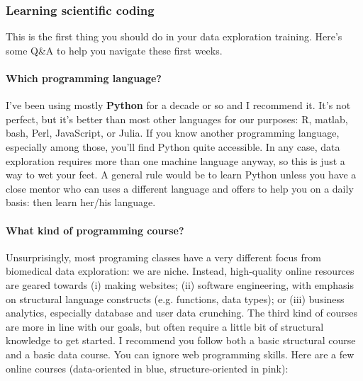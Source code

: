 \documentclass[12pt,a4paper,notitlepage,onecolumn]{article}
\begin{document}
\subsubsection{Learning scientific coding}
This is the first thing you should do in your data exploration training. Here's some Q\&A to help you navigate these first weeks.

\paragraph{Which programming language?} I've been using mostly \textbf{Python} for a decade or so and I recommend it. It's not perfect, but it's better than most other languages for our purposes: R, matlab, bash, Perl, JavaScript, or Julia. If you know another programming language, especially among those, you'll find Python quite accessible. In any case, data exploration requires more than one machine language anyway, so this is just a way to wet your feet. A general rule would be to learn Python unless you have a close mentor who can uses a different language and offers to help you on a daily basis: then learn her/his language.
\paragraph{What kind of programming course?} Unsurprisingly, most programing classes have a very different focus from biomedical data exploration: we are niche. Instead, high-quality online resources are geared towards (i) making websites; (ii) software engineering, with emphasis on structural language constructs (e.g. functions, data types); or (iii) business analytics, especially database and user data crunching. The third kind of courses are more in line with our goals, but often require a little bit of structural knowledge to get started. I recommend you follow both a basic structural course and a basic data course. You can ignore web programming skills. Here are a few online courses (data-oriented in blue, structure-oriented in pink):
\end{document}
